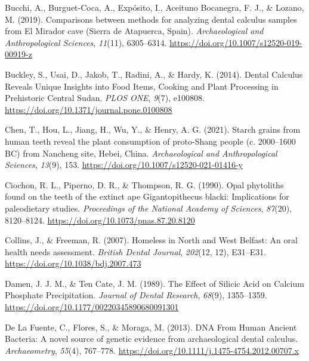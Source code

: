 \documentclass[
  letterpaper,
]{book}
\newlength{\cslhangindent}
\newlength{\cslentryspacingunit} %
\newenvironment{CSLReferences}[2] %
 {%
  \setlength{\parindent}{0pt}
  \ifodd #1
  \let\oldpar\par
  \def\par{\hangindent=\cslhangindent\oldpar}
  \fi
  \setlength{\parskip}{#2\cslentryspacingunit}
 }%
 {}
\begin{document}
\begin{CSLReferences}{1}{0}
\leavevmode{}%
Bucchi, A., Burguet-Coca, A., Expósito, I., Aceituno Bocanegra, F. J.,
\& Lozano, M. (2019). Comparisons between methods for analyzing dental
calculus samples from {El Mirador} cave ({Sierra} de {Atapuerca},
{Spain}). \emph{Archaeological and Anthropological Sciences},
\emph{11}(11), 6305--6314.
\url{https://doi.org/10.1007/s12520-019-00919-z}

\leavevmode{}%
Buckley, S., Usai, D., Jakob, T., Radini, A., \& Hardy, K. (2014).
Dental {Calculus Reveals Unique Insights} into {Food Items}, {Cooking}
and {Plant Processing} in {Prehistoric Central Sudan}. \emph{PLOS ONE},
\emph{9}(7), e100808. \url{https://doi.org/10.1371/journal.pone.0100808}

\leavevmode{}%
Chen, T., Hou, L., Jiang, H., Wu, Y., \& Henry, A. G. (2021). Starch
grains from human teeth reveal the plant consumption of proto-{Shang}
people (c. 2000--1600 {BC}) from {Nancheng} site, {Hebei}, {China}.
\emph{Archaeological and Anthropological Sciences}, \emph{13}(9), 153.
\url{https://doi.org/10.1007/s12520-021-01416-y}

\leavevmode{}%
Ciochon, R. L., Piperno, D. R., \& Thompson, R. G. (1990). Opal
phytoliths found on the teeth of the extinct ape {Gigantopithecus}
blacki: Implications for paleodietary studies. \emph{Proceedings of the
National Academy of Sciences}, \emph{87}(20), 8120--8124.
\url{https://doi.org/10.1073/pnas.87.20.8120}

\leavevmode{}%
Collins, J., \& Freeman, R. (2007). Homeless in {North} and {West
Belfast}: An oral health needs assessment. \emph{British Dental
Journal}, \emph{202}(12, 12), E31--E31.
\url{https://doi.org/10.1038/bdj.2007.473}

\leavevmode{}%
Damen, J. J. M., \& Ten Cate, J. M. (1989). The {Effect} of {Silicic
Acid} on {Calcium Phosphate Precipitation}. \emph{Journal of Dental
Research}, \emph{68}(9), 1355--1359.
\url{https://doi.org/10.1177/00220345890680091301}

\leavevmode{}%
De La Fuente, C., Flores, S., \& Moraga, M. (2013). {DNA From Human
Ancient Bacteria}: {A} novel source of genetic evidence from
archaeological dental calculus. \emph{Archaeometry}, \emph{55}(4),
767--778. \url{https://doi.org/10.1111/j.1475-4754.2012.00707.x}


\end{CSLReferences}
\end{document}
